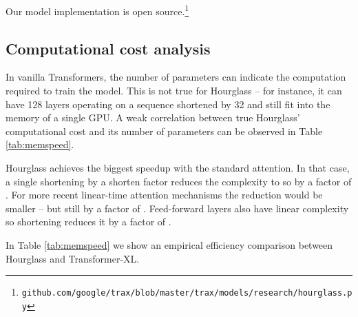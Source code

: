 \documentclass[11pt]{article}
\begin{document}
\renewcommand{\footnotesize}{\fontsize{5pt}{11pt}\selectfont} 
Our model implementation is open source.\footnote{\texttt{github.com/google/trax/blob/master/trax/models/research/hourglass.py}}

\subsection{Computational cost analysis}\label{sec:cost}
In vanilla Transformers, the number of parameters can indicate the computation required to train the model. This is not true for Hourglass -- for instance, it can have 128 layers operating on a sequence shortened by 32 and still fit into the memory of a single GPU. A weak correlation between true Hourglass' computational cost and its number of parameters can be observed in Table \ref{tab:memspeed}.

Hourglass achieves the biggest speedup with the standard  attention. In that case, a single shortening by a shorten factor  reduces the complexity to  so by a factor of .
For more recent linear-time attention mechanisms \cite{katharopoulos2020transformers, choromanski2021rethinking}
the reduction would be smaller -- but still by a factor of .
Feed-forward layers also have linear complexity so shortening
reduces it by a factor of . 

In Table \ref{tab:memspeed} we show an empirical efficiency comparison between
Hourglass and Transformer-XL.
\end{document}
